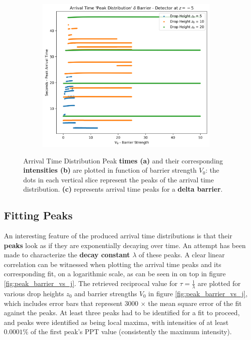 \begin{figure}
\begin{subfigure}[b]{1\linewidth}
        \includegraphics[width=1\linewidth]{Figures//Yoshida/7d42f617-724e-4ce1-9783-f4b1483645be.png}
        \caption{}
    \end{subfigure}
    \caption{Arrival Time Distribution Peak \textbf{times (a)} and their corresponding \textbf{intensities (b)} are plotted in function of barrier strength $V_0$: the dots in each vertical slice represent the peaks of the arrival time distribution. \textbf{(c)} represents arrival time peaks for a \textbf{delta barrier}.}
    \label{fig:peak_barrier_vs_secs}
\end{figure}

\subsection{Fitting Peaks}

An interesting feature of the produced arrival time distributions is that their \textbf{peaks} look as if they are exponentially decaying over time. An attempt has been made to characterize the \textbf{decay constant $\lambda$} of these peaks. A clear linear correlation can be witnessed when plotting the arrival time peaks and its corresponding fit, on a logarithmic scale, as can be seen in on top in figure \ref{fig:peak_barrier_vs_j}. The retrieved reciprocal value for $\tau = \frac{1}{\lambda}$ are plotted for various drop heights $z_0$ and barrier strengths $V_0$ in figure \ref{fig:peak_barrier_vs_j}, which includes error bars that represent 3000 $\times$ the mean square error of the fit against the peaks. At least three peaks had to be identified for a fit to proceed, and peaks were identified as being local maxima, with intensities of at least $0.0001\%$ of the first peak's PPT value (consistently the maximum intensity).

